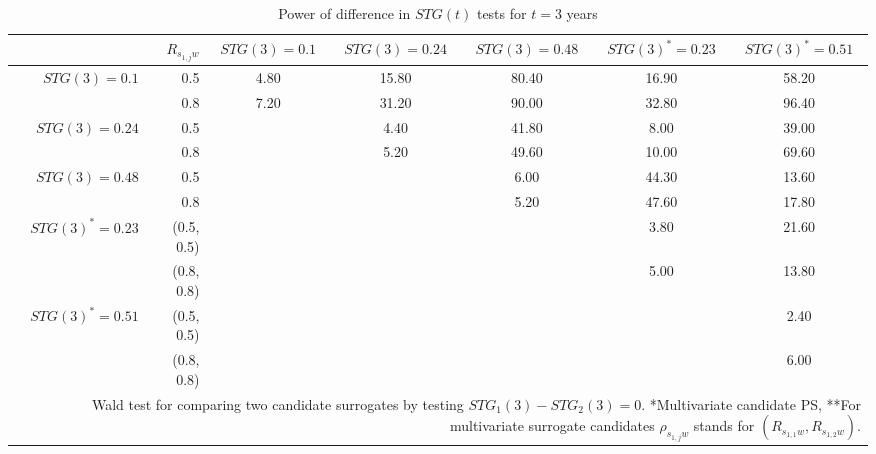 \documentclass[times, doublespace]{simauth}
\begin{document}
\begin{table}
\begin{center}
\caption{Power of difference in $STG(t)$ tests for $t=3$ years \label{Power}}
\begin{tabular}{rrccccc}
  \hline
 & $R_{s_{1,j}w}$ & $STG(3)=0.1$  & $STG(3)=0.24$  & $STG(3)=0.48$& $STG(3)^{*}=0.23$  & $STG(3)^{*}=0.51$\\
  \hline
$STG(3)=0.1$ &0.5 & 4.80 & 15.80 & 80.40 & 16.90 & 58.20 \\ 
   &0.8 &7.20 & 31.20 & 90.00 & 32.80 & 96.40 \\ 
$STG(3)=0.24$ &0.5&  & 4.40 & 41.80 & 8.00 & 39.00 \\ 
   &0.8 &  & 5.20 & 49.60 & 10.00 & 69.60 \\ 
$STG(3)=0.48$&0.5 &  &  & 6.00 & 44.30 & 13.60 \\ 
   &0.8&  &  & 5.20 & 47.60 & 17.80 \\ 
$STG(3)^{*}=0.23$&(0.5, 0.5) &  &  &  & 3.80 & 21.60 \\ 
   &(0.8, 0.8) &  &  &  & 5.00 & 13.80 \\ 
$STG(3)^{*}=0.51$&(0.5, 0.5)&   &  &  &  & 2.40 \\ 
   &(0.8, 0.8)&  &  &  &  & 6.00 \\ 
   \hline
\multicolumn{7}{p{9in}}{Wald test for comparing two candidate surrogates by testing $STG_1(3)-STG_2(3)=0$. *Multivariate candidate PS, **For multivariate surrogate candidates $\rho_{s_{1,j}w}$ stands for $(R_{s_{1,1}w},R_{s_{1,2}w})$.}
\end{tabular}
\end{center}
\end{table}
\end{document}
